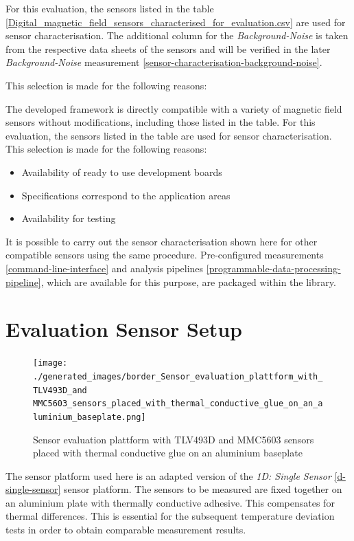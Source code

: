 For this evaluation, the sensors listed in the table
\ref{Digital_magnetic_field_sensors_characterised_for_evaluation.csv}
are used for sensor characterisation. The additional column for the
\emph{Background-Noise} is taken from the respective data sheets of the
sensors and will be verified in the later \emph{Background-Noise}
measurement \ref{sensor-characterisation-background-noise}.

This selection is made for the following reasons:

The developed framework is directly compatible with a variety of
magnetic field sensors without modifications, including those listed in
the table. For this evaluation, the sensors listed in the table are used
for sensor characterisation. This selection is made for the following
reasons:

\begin{itemize}
\tightlist
\item
  Availability of ready to use development boards
\item
  Specifications correspond to the application areas
\item
  Availability for testing
\end{itemize}

It is possible to carry out the sensor characterisation shown here for
other compatible sensors using the same procedure. Pre-configured
measurements \ref{command-line-interface} and analysis pipelines
\ref{programmable-data-processing-pipeline}, which are available for
this purpose, are packaged within the library.

\hypertarget{evaluation-sensor-setup}{%
\section{Evaluation Sensor Setup}\label{evaluation-sensor-setup}}

\begin{figure}
\centering
\texttt{[image: ./generated\_images/border\_Sensor\_evaluation\_plattform\_with\_TLV493D\_and MMC5603\_sensors\_placed\_with\_thermal\_conductive\_glue\_on\_an\_aluminium\_baseplate.png]}
\caption{Sensor evaluation plattform with TLV493D and MMC5603 sensors
placed with thermal conductive glue on an aluminium baseplate
\label{Sensor_evaluation_plattform_with_TLV493D_and MMC5603_sensors_placed_with_thermal_conductive_glue_on_an_aluminium_baseplate.png}}
\end{figure}

The sensor platform used here is an adapted version of the \emph{1D:
Single Sensor} \ref{d-single-sensor} sensor platform. The sensors to be
measured are fixed together on an aluminium plate with thermally
conductive adhesive. This compensates for thermal differences. This is
essential for the subsequent temperature deviation tests in order to
obtain comparable measurement results.

